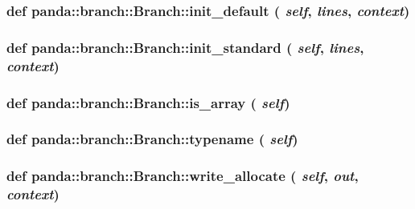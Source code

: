 \label{classpanda_1_1branch_1_1Branch_ad9e2f082c14fcc478088c3be379ce475}
\hypertarget{classpanda_1_1branch_1_1Branch_aa3f076a42652088d9ef97894efd23757}{
\subsubsection[{init\_\-default}]{\setlength{\rightskip}{0pt plus 5cm}def panda::branch::Branch::init\_\-default ( {\em self}, \/   {\em lines}, \/   {\em context})}}
\label{classpanda_1_1branch_1_1Branch_aa3f076a42652088d9ef97894efd23757}
\hypertarget{classpanda_1_1branch_1_1Branch_a954282a0978ece2630a8e5e157e4f157}{
\subsubsection[{init\_\-standard}]{\setlength{\rightskip}{0pt plus 5cm}def panda::branch::Branch::init\_\-standard ( {\em self}, \/   {\em lines}, \/   {\em context})}}
\label{classpanda_1_1branch_1_1Branch_a954282a0978ece2630a8e5e157e4f157}
\hypertarget{classpanda_1_1branch_1_1Branch_af707e9b8d07cdf016923cd0f22f921aa}{
\subsubsection[{is\_\-array}]{\setlength{\rightskip}{0pt plus 5cm}def panda::branch::Branch::is\_\-array ( {\em self})}}
\label{classpanda_1_1branch_1_1Branch_af707e9b8d07cdf016923cd0f22f921aa}
\hypertarget{classpanda_1_1branch_1_1Branch_a5db438acba1b1fe4f66b41eaabd0f042}{
\subsubsection[{typename}]{\setlength{\rightskip}{0pt plus 5cm}def panda::branch::Branch::typename ( {\em self})}}
\label{classpanda_1_1branch_1_1Branch_a5db438acba1b1fe4f66b41eaabd0f042}
\hypertarget{classpanda_1_1branch_1_1Branch_aa95fcc11b08357eb8bdc4b649c15ca9c}{
\subsubsection[{write\_\-allocate}]{\setlength{\rightskip}{0pt plus 5cm}def panda::branch::Branch::write\_\-allocate ( {\em self}, \/   {\em out}, \/   {\em context})}}
